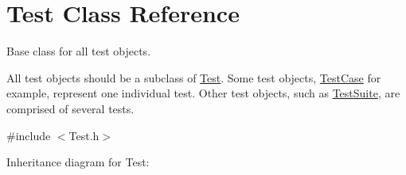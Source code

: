 \hypertarget{class_test}{\section{Test Class Reference}
\label{class_test}
}


Base class for all test objects.

All test objects should be a subclass of \hyperlink{class_test}{Test}. Some test objects, \hyperlink{class_test_case}{Test\+Case} for example, represent one individual test. Other test objects, such as \hyperlink{class_test_suite}{Test\+Suite}, are comprised of several tests.  




{\ttfamily \#include $<$Test.\+h$>$}



Inheritance diagram for Test\+:
